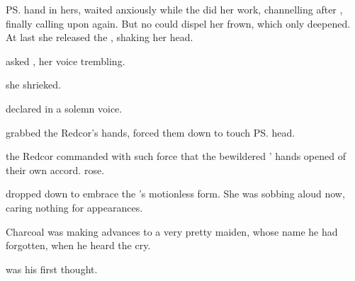


\begin{comment}
\subsection{Into the Light}
\end{comment}

\new
\ps{\Icor}{} hand in hers, \Tiroco{} waited anxiously while the \soror{} did her work, channelling \Sephirah{} after \Sephirah{}, finally calling upon \Ishiel{} again. But no \Archon{} could dispel her frown, which only deepened. At last she released the \rayuth, shaking her head. 

 asked \Tiroco, her voice trembling. 


 she shrieked. 

 \Camilienne{} declared in a solemn voice. 

 \Tiroco{} grabbed the Redcor's hands, forced them down to touch \ps{\Icor}{} head. 

 the Redcor commanded with such force that the bewildered \rinyuth' hands opened of their own accord. \Camilienne{} rose. 

\Tiroco{} dropped down to embrace the \rayuth's motionless form. She was sobbing aloud now, caring nothing for appearances.  







\begin{comment}
\subsection{Charcoal}
\end{comment}

\new
Charcoal was making advances to a very pretty maiden, whose name he had forgotten, when he heard the cry. 


 was his first thought.

